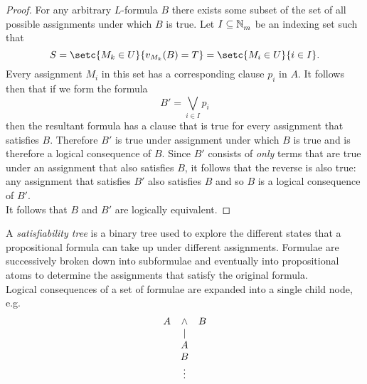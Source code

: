 \documentclass[../MathsNotesBase.tex]{subfiles}
\begin{document}
{\begin{proof}
 			For any arbitrary $L$-formula $B$ there exists some subset of the set of all possible assignments under which $B$ is true. Let ${ I \subseteq \mathbb{N}^{}_m }$ be an indexing set such that
 			\[ S = \setc{M_k \in U}{v_{M_k}(B) = T} = \setc{M_i \in U}{i \in I}. \]
 			Every assignment $M_i$ in this set has a corresponding clause $p_i$ in $A$. It follows then that if we form the formula
 			\[ B' = \bigvee_{i \in I} p_i  \]
 			then the resultant formula has a clause that is true for every assignment that satisfies $B$. Therefore $B'$ is true under assignment under which $B$ is true and is therefore a logical consequence of $B$. Since $B'$ consists of \textit{only} terms that are true under an assignment that also satisfies $B$, it follows that the reverse is also true: any assignment that satisfies $B'$ also satisfies $B$ and so $B$ is a logical consequence of $B'$.\\
 			
 			It follows that $B$ and $B'$ are logically equivalent.
 		\end{proof}
 	
 	
 	
 	
 		\nl[12]
 		\nl
 		A \textit{satisfiability tree} is a binary tree used to explore the different states that a propositional formula can take up under different assignments. Formulae are successively broken down into subformulae and eventually into propositional atoms to determine the assignments that satisfy the original formula.\\
 			
 		Logical consequences of a set of formulae are expanded into a single child node, e.g.
 		\[ 
	 		\begin{array}{*3c}
	 			A & \land & B  \\
	 			  &  |    & \\
	 			  &  A    & \\
	 			  &  B    & \\
	 			  &\vdots &
	 		\end{array}
 		\]
 			
}
\end{document}
